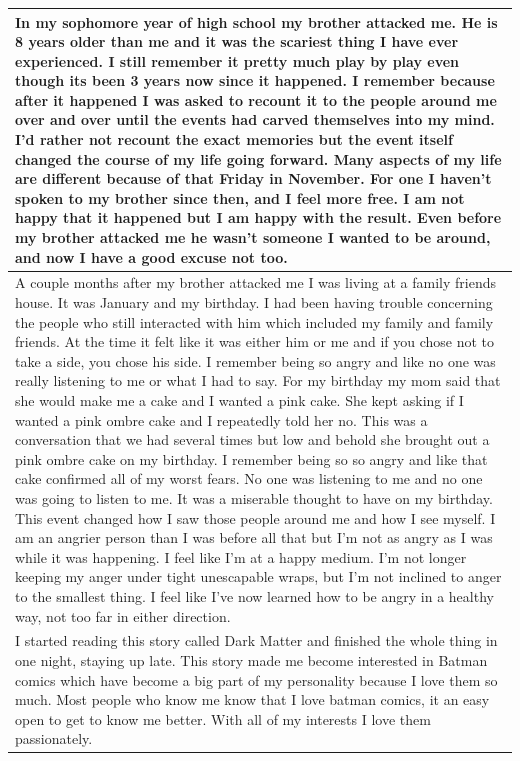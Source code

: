 \documentclass[
  .7em,
  letterpaper,
  DIV=11,
  numbers=noendperiod]{scrartcl}
\begin{document}
\begin{table}
\begin{tabular}{l}
In my sophomore year of high school my brother attacked me. He is 8 years older than me and it was the scariest thing I have ever experienced. I still remember it pretty much play by play even though its been 3 years now since it happened. I remember because after it happened I was asked to recount it to the people around me over and over until the events had carved themselves into my mind. I'd rather not recount the exact memories but the event itself changed the course of my life going forward. Many aspects of my life are different because of that Friday in November. For one I haven't spoken to my brother since then, and I feel more free. I am not happy that it happened but I am happy with the result. Even before my brother attacked me he wasn't someone I wanted to be around, and now I have a good excuse not too.\\
\hline
A couple months after my brother attacked me I was living at a family friends house. It was January and my birthday. I had been having trouble concerning the people who still interacted with him which included my family and family friends. At the time it felt like it was either him or me and if you chose not to take a side, you chose his side. I remember being so angry and like no one was really listening to me or what I had to say. For my birthday my mom said that she would make me a cake and I wanted a pink cake. She kept asking if I wanted a pink ombre cake and I repeatedly told her no. This was a conversation that we had several times but low and behold she brought out a pink ombre cake on my birthday. I remember being so so angry and like that cake confirmed all of my worst fears. No one was listening to me and no one was going to listen to me. It was a miserable thought to have on my birthday. This event changed how I saw those people around me and how I see myself. I am an angrier person than I was before all that but I'm not as angry as I was while it was happening. I feel like I'm at a happy medium. I'm not longer keeping my anger under tight unescapable wraps, but I'm not inclined to anger to the smallest thing. I feel like I've now learned how to be angry in a healthy way, not too far in either direction.\\
\hline
I started reading this story called Dark Matter and finished the whole thing in one night, staying up late. This story made me become interested in Batman comics which have become a big part of my personality because I love them so much. Most people who know me know that I love batman comics, it an easy open to get to know me better. With all of my interests I love them passionately.\\

\end{tabular}
\end{table}
\end{document}
